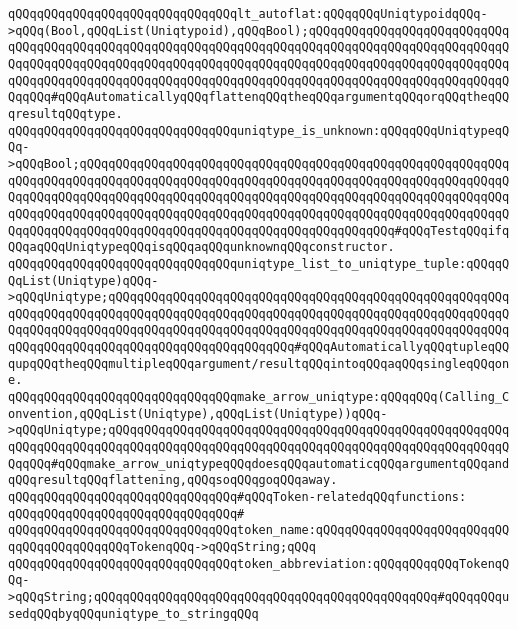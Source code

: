 \newline
\verb|qQQqqQQqqQQqqQQqqQQqqQQqqQQqqQQqlt_autoflat:qQQqqQQqUniqtypoidqQQq->qQQq(Bool,qQQqList(Uniqtypoid),qQQqBool);qQQqqQQqqQQqqQQqqQQqqQQqqQQqqQQqqQQqqQQqqQQqqQQqqQQqqQQqqQQqqQQqqQQqqQQqqQQqqQQqqQQqqQQqqQQqqQQqqQQqqQQqqQQqqQQqqQQqqQQqqQQqqQQqqQQqqQQqqQQqqQQqqQQqqQQqqQQqqQQqqQQqqQQqqQQqqQQqqQQqqQQqqQQqqQQqqQQqqQQqqQQqqQQqqQQqqQQqqQQqqQQqqQQqqQQqqQQqqQQqqQQq#qQQqAutomaticallyqQQqflattenqQQqtheqQQqargumentqQQqorqQQqtheqQQqresultqQQqtype.|\newline
\newline
\verb|qQQqqQQqqQQqqQQqqQQqqQQqqQQqqQQquniqtype_is_unknown:qQQqqQQqUniqtypeqQQq->qQQqBool;qQQqqQQqqQQqqQQqqQQqqQQqqQQqqQQqqQQqqQQqqQQqqQQqqQQqqQQqqQQqqQQqqQQqqQQqqQQqqQQqqQQqqQQqqQQqqQQqqQQqqQQqqQQqqQQqqQQqqQQqqQQqqQQqqQQqqQQqqQQqqQQqqQQqqQQqqQQqqQQqqQQqqQQqqQQqqQQqqQQqqQQqqQQqqQQqqQQqqQQqqQQqqQQqqQQqqQQqqQQqqQQqqQQqqQQqqQQqqQQqqQQqqQQqqQQqqQQqqQQqqQQqqQQqqQQqqQQqqQQqqQQqqQQqqQQqqQQqqQQqqQQqqQQqqQQqqQQqqQQqqQQq#qQQqTestqQQqifqQQqaqQQqUniqtypeqQQqisqQQqaqQQqunknownqQQqconstructor.|\newline
\newline
\verb|qQQqqQQqqQQqqQQqqQQqqQQqqQQqqQQquniqtype_list_to_uniqtype_tuple:qQQqqQQqList(Uniqtype)qQQq->qQQqUniqtype;qQQqqQQqqQQqqQQqqQQqqQQqqQQqqQQqqQQqqQQqqQQqqQQqqQQqqQQqqQQqqQQqqQQqqQQqqQQqqQQqqQQqqQQqqQQqqQQqqQQqqQQqqQQqqQQqqQQqqQQqqQQqqQQqqQQqqQQqqQQqqQQqqQQqqQQqqQQqqQQqqQQqqQQqqQQqqQQqqQQqqQQqqQQqqQQqqQQqqQQqqQQqqQQqqQQqqQQqqQQqqQQqqQQqqQQqqQQq#qQQqAutomaticallyqQQqtupleqQQqupqQQqtheqQQqmultipleqQQqargument/resultqQQqintoqQQqaqQQqsingleqQQqone.|\newline
\newline
\verb|qQQqqQQqqQQqqQQqqQQqqQQqqQQqqQQqmake_arrow_uniqtype:qQQqqQQq(Calling_Convention,qQQqList(Uniqtype),qQQqList(Uniqtype))qQQq->qQQqUniqtype;qQQqqQQqqQQqqQQqqQQqqQQqqQQqqQQqqQQqqQQqqQQqqQQqqQQqqQQqqQQqqQQqqQQqqQQqqQQqqQQqqQQqqQQqqQQqqQQqqQQqqQQqqQQqqQQqqQQqqQQqqQQqqQQqqQQq#qQQqmake_arrow_uniqtypeqQQqdoesqQQqautomaticqQQqargumentqQQqandqQQqresultqQQqflattening,qQQqsoqQQqgoqQQqaway.|\newline
\newline
\verb|qQQqqQQqqQQqqQQqqQQqqQQqqQQqqQQq#qQQqToken-relatedqQQqfunctions:|\newline
\verb|qQQqqQQqqQQqqQQqqQQqqQQqqQQqqQQq#|\newline
\verb|qQQqqQQqqQQqqQQqqQQqqQQqqQQqqQQqtoken_name:qQQqqQQqqQQqqQQqqQQqqQQqqQQqqQQqqQQqqQQqqQQqTokenqQQq->qQQqString;qQQq|\newline
\verb|qQQqqQQqqQQqqQQqqQQqqQQqqQQqqQQqtoken_abbreviation:qQQqqQQqqQQqTokenqQQq->qQQqString;qQQqqQQqqQQqqQQqqQQqqQQqqQQqqQQqqQQqqQQqqQQqqQQq#qQQqqQQqusedqQQqbyqQQquniqtype_to_stringqQQq|\newline
